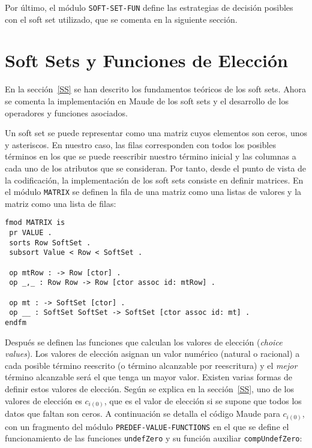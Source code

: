 Por último, el módulo \texttt{SOFT-SET-FUN} define las estrategias de decisión posibles con el soft set utilizado, que se comenta en la siguiente sección.



\section{Soft Sets y Funciones de Elección}
\label{sec:SoftSets}

En la sección~\ref{SS} se han descrito los fundamentos teóricos de los soft sets. 
Ahora se comenta la implementación en Maude de los soft sets y el desarrollo de los operadores y funciones asociados.
\smallskip

Un soft set se puede representar como una matriz cuyos elementos son ceros, unos y asteriscos. En nuestro caso, las filas corresponden con todos los posibles términos en los que se puede reescribir nuestro término inicial y las columnas a cada uno de los atributos que se consideran.
Por tanto, desde el punto de vista de la codificación, la implementación de los soft sets consiste en definir matrices. En el módulo \texttt{MATRIX} se definen la fila de una matriz como una listas de valores y la matriz como una lista de filas:

\begin{lstlisting}[language=Maude]
fmod MATRIX is
 pr VALUE .
 sorts Row SoftSet .
 subsort Value < Row < SoftSet .

 op mtRow : -> Row [ctor] .
 op _,_ : Row Row -> Row [ctor assoc id: mtRow] .

 op mt : -> SoftSet [ctor] .
 op __ : SoftSet SoftSet -> SoftSet [ctor assoc id: mt] .
endfm
\end{lstlisting}
\medskip

Después se definen las funciones que calculan los valores de elección (\textit{choice values}).
Los valores de elección asignan un valor numérico (natural o racional) a cada posible término reescrito (o término alcanzable por reescritura)
y el \textit{mejor} término alcanzable será el que tenga un mayor valor.
Existen varias formas de definir estos valores de elección. 
Según se explica en la sección~\ref{SS}, uno de los valores de elección es $c_{i(0)}$, que es el valor de elección si se supone que todos los datos que faltan son ceros.
A continuación se detalla el código Maude para $c_{i(0)}$, con un fragmento del módulo \texttt{PREDEF-VALUE-FUNCTIONS} en el que se define el funcionamiento de las funciones \texttt{undefZero} y su función auxiliar \texttt{compUndefZero}:

